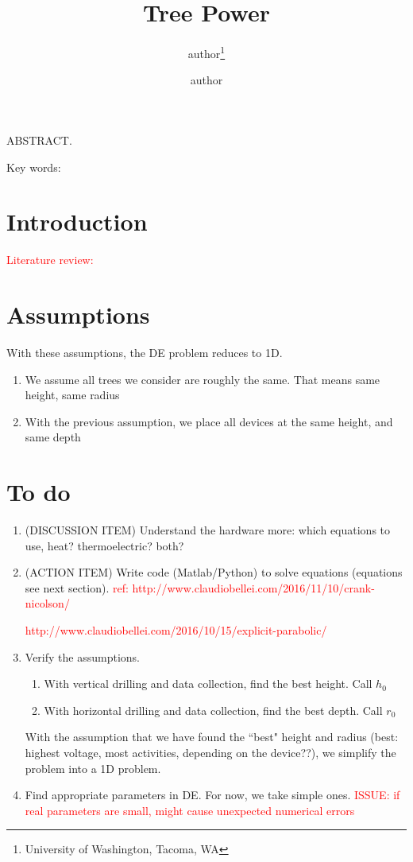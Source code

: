 \documentclass[12pt]{article}
\title{Tree Power}
\author{author\thanks{University of Washington, Tacoma, WA} %
\and author\footnotemark[1]}
\begin{document}
\maketitle

\noindent ABSTRACT. 

\vspace{1cm}

\noindent Key words: 


\section*{Introduction}  \textcolor{red}{Literature review:}



\section{Assumptions}

With these assumptions, the DE problem reduces to 1D.
\begin{enumerate}
\item We assume all trees we consider are roughly the same. That means same height, same radius
\item With the previous assumption, we place all devices at the same height, and same depth
\end{enumerate}



\section{To do}
\begin{enumerate}
\item (DISCUSSION ITEM) Understand the hardware more: which equations to use, heat? thermoelectric? both?

\item (ACTION ITEM) Write code (Matlab/Python) to solve equations (equations see next section). \textcolor{red}{ref: http://www.claudiobellei.com/2016/11/10/crank-nicolson/}

\textcolor{red}{http://www.claudiobellei.com/2016/10/15/explicit-parabolic/}

\item Verify the assumptions. 
\begin{enumerate}
\item With vertical drilling and data collection, find the best height. Call $h_0$
\item With horizontal drilling and data collection, find the best depth. Call $r_0$
\end{enumerate}

With the assumption that we have found the ``best" height and radius (best: highest voltage, most activities, depending on the device??), we simplify the problem into a 1D problem. 


\item Find appropriate parameters in DE. For now, we take simple ones. \textcolor{red}{ISSUE: if real parameters are small, might cause unexpected numerical errors}


\end{enumerate}
\end{document}
